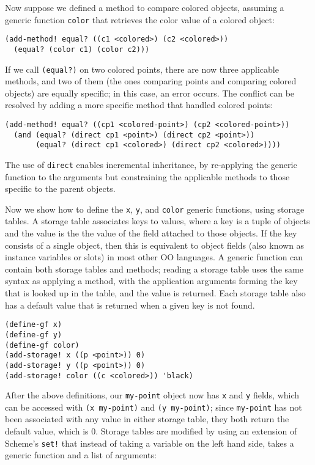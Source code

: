 \documentclass{article}
\begin{document}
Now suppose we defined a method to compare colored objects, assuming a 
generic function \texttt{color} that retrieves the color value of a
colored object:

\begin{verbatim}
(add-method! equal? ((c1 <colored>) (c2 <colored>))
  (equal? (color c1) (color c2)))
\end{verbatim}

If we call \texttt{(equal?)} on two colored points, there are now three
applicable methods, and two of them (the ones comparing points and
comparing colored objects) are equally specific; in this case, an
error occurs.  The conflict can be resolved by adding a more specific
method that handled colored points:

\begin{verbatim}
(add-method! equal? ((cp1 <colored-point>) (cp2 <colored-point>))
  (and (equal? (direct cp1 <point>) (direct cp2 <point>))
       (equal? (direct cp1 <colored>) (direct cp2 <colored>))))
\end{verbatim}

The use of \texttt{direct} enables incremental inheritance, by
re-applying the generic function to the arguments but constraining the
applicable methods to those specific to the parent objects.

Now we show how to define the \texttt{x}, \texttt{y}, and
\texttt{color} generic functions, using storage tables.  A storage
table associates keys to values, where a key is a tuple of objects and
the value is the the value of the field attached to those objects.  If
the key consists of a single object, then this is equivalent to object
fields (also known as instance variables or slots) in most other OO
languages.  A generic function can contain both storage tables and
methods; reading a storage table uses the same syntax as applying a
method, with the application arguments forming the key that is looked
up in the table, and the value is returned.  Each storage table also
has a default value that is returned when a given key is not found.

\begin{verbatim}
(define-gf x)
(define-gf y)
(define-gf color)
(add-storage! x ((p <point>)) 0)
(add-storage! y ((p <point>)) 0)
(add-storage! color ((c <colored>)) 'black)
\end{verbatim}

After the above definitions, our \texttt{my-point} object now has
\texttt{x} and \texttt{y} fields, which can be accessed with
\texttt{(x my-point)} and \texttt{(y my-point)}; 
since \texttt{my-point} has not been associated with any value in
either storage table, they both return the default value, which is 0.
Storage tables are modified by using an extension of Scheme's
\texttt{set!} that instead of taking a variable on the left hand side, 
takes a generic function and a list of arguments:
\end{document}
